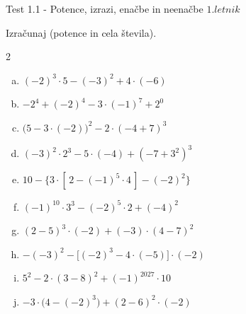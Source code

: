 \documentclass[a4paper,12pt]{letter}
\renewcommand{\headrulewidth}{3pt}
\renewcommand{\headrulewidth}{0.3pt}
\newcounter{tocke}
\begin{document}
\pagestyle{fancy}
\renewcommand\headrulewidth{0pt}
\lhead{}\chead{}\rhead{}
\rfoot{\vspace*{-2\baselineskip}}
\renewcommand{\vec}{\overrightarrow}
\def\programletnik{1. letnik}
\def\naslov{Test 1.1 - }
\def\sklop{Potence, izrazi, enačbe in neenačbe}
\def\tockeA{0}
\def\tockeB{0}
\def\tockeC{0}
\def\tockeD{0}
\def\tockeE{0}
\def\tockeF{0}
\def\tockeG{0}
\def\tockeH{0}
\def\tockeI{0}
\def\tockeJ{0}
\def\tockeK{0}
\def\tockeL{0}
\begin{minipage}{20cm}
\begin{bclogo}[couleur=brown!30,
  arrondi=0,ombre=true, couleurOmbre=gray!50,
logo =\bcplume,
  noborder=true]
{\textrm{{\Large{\naslov \sklop} \Huge{}
\large{} \hfill $\programletnik$}}}
\end{bclogo}
\end{minipage}
\begin{minipage}{20cm}
\begin{bclogo}[couleur=brown!30,
  arrondi=0,ombre=true, couleurOmbre=gray!50,
logo =\bcplume,
  noborder=true]
{\textrm{{}}}
\end{bclogo}
\end{minipage}

\begin{naloga}[\hfill $\tockeA$] \addtocounter{tocke}{\numexpr\tockeA\relax}
Izra\v{c}unaj (potence in cela \v{s}tevila).
\begin{multicols}{2}
\begin{enumerate}[a)]
\item $\displaystyle (-2)^3\cdot5-(-3)^2+4\cdot(-6)$
\item $\displaystyle -2^4+(-2)^4-3\cdot(-1)^7+2^0$
\item $\displaystyle \big(5-3\cdot(-2)\big)^2-2\cdot(-4+7)^3$
\item $\displaystyle (-3)^2\cdot2^3-5\cdot(-4)+(-7+3^2)^3$
\item $\displaystyle 10-\big\{3\cdot[\,2-(-1)^5\cdot4\,]-(-2)^2\big\}$
\end{enumerate}
\columnbreak
\begin{enumerate}[a)]\setcounter{enumi}{5}
\item $\displaystyle (-1)^{10}\cdot3^3-(-2)^5\cdot2+(-4)^2$
\item $\displaystyle (2-5)^3\cdot(-2)+(-3)\cdot(4-7)^2$
\item $\displaystyle -(-3)^2-\big[(-2)^3-4\cdot(-5)\big]\cdot(-2)$
\item $\displaystyle 5^2-2\cdot(3-8)^2+(-1)^{2027}\cdot10$
\item $\displaystyle -3\cdot\big(4-(-2)^3\big)+(2-6)^2\cdot(-2)$
\end{enumerate}
\end{multicols}
\end{naloga}
\end{document}

